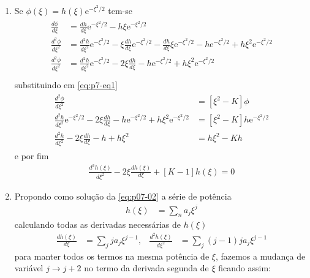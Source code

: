\begin{prob}
\begin{sol}
\begin{enumerate}[label=\alph *)]
			\item Se $\phi(\xi)=h(\xi)\mathrm{e}^{-\xi^{2}/2}$ tem-se
				\begin{align}
						\begin{split}
							\frac{d \phi}{d \xi} &= \frac{dh}{d \xi}\mathrm{e}^{-\xi^{2}/2}-h \xi \mathrm{e}^{-\xi^{2}/2}\\
							\frac{d^{2} \phi}{d \xi^{2}} &= \frac{d^{2}h}{d \xi^{2}}\mathrm{e}^{-\xi^{2}/2}-\xi \frac{dh}{d \xi}\mathrm{e}^{-\xi^{2}/2}-\frac{dh}{d \xi} \xi \mathrm{e}^{-\xi^{2}/2}-h \mathrm{e}^{-\xi^{2}/2}+h \xi^{2}\mathrm{e}^{-\xi^{2}/2}\\
							\frac{d^{2} \phi}{d \xi^{2}} &= \frac{d^{2}h}{d \xi^{2}}\mathrm{e}^{-\xi^{2}/2}-2 \xi \frac{dh}{d \xi}-h \mathrm{e}^{-\xi^{2}/2}+h \xi^{2}\mathrm{e}^{-\xi^{2}/2}\\
						\end{split}
				\end{align}
				substituindo em \eqref{eq:p7-eq1}
				\begin{align}
						\begin{split}
							\frac{d^{2} \phi}{d \xi^{2}} &= \left[\xi^{2}-K\right] \phi\\
							\frac{d^{2}h}{d \xi^{2}}\mathrm{e}^{-\xi^{2}/2}-2 \xi \frac{dh}{d \xi}-h \mathrm{e}^{-\xi^{2}/2}+h \xi^{2}\mathrm{e}^{-\xi^{2}/2} &= \left[\xi^{2}-K\right]h \mathrm{e}^{-\xi^{2}/2}\\
							\frac{d^{2}h}{d \xi^{2}}-2 \xi \frac{dh}{d \xi}-h+h \xi^{2} &= h \xi^{2}-Kh
						\end{split}
				\end{align}
				e por fim
				\begin{align}
					\label{eq:p07-02}
						\boxed{
							\frac{d^{2}h(\xi)}{d \xi^{2}}-2 \xi \frac{dh(\xi)}{d \xi}+\left[K-1\right]h(\xi)=0
						}
				\end{align}
			\item Propondo como solução da \eqref{eq:p07-02} a série de potência
				\begin{align}
					h(\xi) &= \sum_{n}a_{j} \xi^{j}
				\end{align}
				calculando todas as derivadas necessárias de $h(\xi)$
				\begin{align}
					\frac{dh(\xi)}{d \xi} &= \sum_{j}ja_{j} \xi^{j-1}, & \frac{d^{2}h(\xi)}{d \xi^{2}} &= \sum_{j}(j-1)ja_{j} \xi^{j-1}
				\end{align}
				para manter todos os termos na mesma potência de $\xi$, fazemos a mudança de variável $j\to j+2$ no termo da derivada segunda de $\xi$ ficando assim:

\end{enumerate}
\end{sol}
\end{prob}
